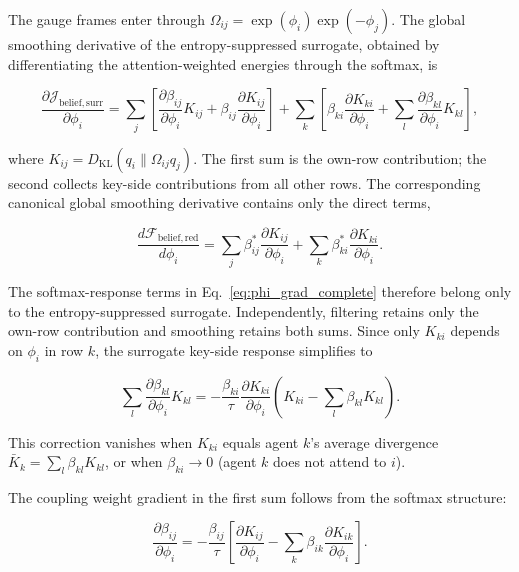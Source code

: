 \documentclass[twoside,11pt]{article}
\begin{document}
The gauge frames enter through $\Omega_{ij}=\exp(\phi_i)\exp(-\phi_j)$. The global smoothing derivative of the entropy-suppressed surrogate, obtained by differentiating the attention-weighted energies through the softmax, is

\begin{equation}
\frac{\partial \mathcal{J}_{\mathrm{belief,surr}}}{\partial \phi_i}
= \sum_j \left[
\frac{\partial \beta_{ij}}{\partial \phi_i} K_{ij}
+ \beta_{ij} \frac{\partial K_{ij}}{\partial \phi_i}
\right]
+ \sum_k \left[
\beta_{ki} \frac{\partial K_{ki}}{\partial \phi_i}
+ \sum_l \frac{\partial \beta_{kl}}{\partial \phi_i} K_{kl}
\right],
\label{eq:phi_grad_complete}
\end{equation}

where $K_{ij}=D_{\mathrm{KL}}(q_i\|\Omega_{ij}q_j)$. The first sum is the own-row contribution; the second collects key-side contributions from all other rows. The corresponding canonical global smoothing derivative contains only the direct terms,

\begin{equation}
\frac{d\mathcal{F}_{\mathrm{belief,red}}}{d\phi_i}
=\sum_j\beta_{ij}^*\frac{\partial K_{ij}}{\partial\phi_i}
+\sum_k\beta_{ki}^*\frac{\partial K_{ki}}{\partial\phi_i}.
\label{eq:phi_grad_canonical}
\end{equation}

The softmax-response terms in Eq.~\eqref{eq:phi_grad_complete} therefore belong only to the entropy-suppressed surrogate. Independently, filtering retains only the own-row contribution and smoothing retains both sums. Since only $K_{ki}$ depends on $\phi_i$ in row $k$, the surrogate key-side response simplifies to

\begin{equation}
\sum_l \frac{\partial \beta_{kl}}{\partial \phi_i} K_{kl}
= -\frac{\beta_{ki}}{\tau}\frac{\partial K_{ki}}{\partial \phi_i}
\left(K_{ki} - \sum_l \beta_{kl} K_{kl}\right).
\label{eq:reverse_beta_grad_phi}
\end{equation}

This correction vanishes when $K_{ki}$ equals agent $k$'s average divergence $\bar{K}_k = \sum_l \beta_{kl} K_{kl}$, or when $\beta_{ki} \to 0$ (agent $k$ does not attend to $i$).

The coupling weight gradient in the first sum follows from the softmax structure:

\begin{equation}
\frac{\partial \beta_{ij}}{\partial \phi_i} = -\frac{\beta_{ij}}{\tau}\left[
\frac{\partial K_{ij}}{\partial \phi_i} - \sum_k \beta_{ik} \frac{\partial K_{ik}}{\partial \phi_i}
\right].
\label{eq:beta_grad_phi}
\end{equation}
\end{document}
